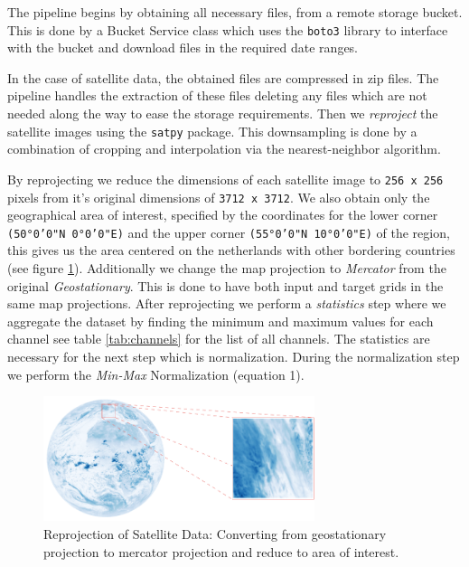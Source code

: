 The pipeline begins by obtaining all necessary files, from a remote storage bucket.
This is done by a Bucket Service class which uses the \texttt{boto3} \cite{boto}
library to interface with the bucket and download files in the required date ranges.
\smallskip

In the case of satellite data, the obtained files are compressed in zip files. The pipeline handles the extraction of these files deleting any files which are not needed along the way to ease the storage requirements.
Then we \textit{reproject} the satellite images using the \texttt{satpy} package. This downsampling is done by a combination of cropping and interpolation via the nearest-neighbor algorithm.
\smallskip

By reprojecting we reduce the dimensions of each satellite image to \texttt{256 x 256} pixels from it's original dimensions of \texttt{3712 x 3712}.
We also obtain only the geographical area of interest, specified by the coordinates for the lower corner \texttt{(50°0'0"N 0°0'0"E)} and the upper corner \texttt{(55°0'0"N 10°0'0"E)} of the region, this gives us
the area centered on the netherlands with other bordering countries (see figure \ref{fig:reprojection}). Additionally we change the map projection to \textit{Mercator} from the original \textit{Geostationary}.
This is done to have both input and target grids in the same map projections.
After reprojecting we perform a \textit{statistics} step where we aggregate the dataset by finding the minimum and maximum values for each channel see table \ref{tab:channels} for the list of all channels.
The statistics are necessary for the next step which is normalization. During the normalization step we perform the \textit{Min-Max} Normalization (equation 1).

\begin{figure}
  \centering
  \includegraphics[width=225pt]{./images/reprored.png}
  \caption{Reprojection of Satellite Data: Converting from geostationary projection to mercator projection and reduce to area of interest.}
  \label{fig:reprojection}
\end{figure}


